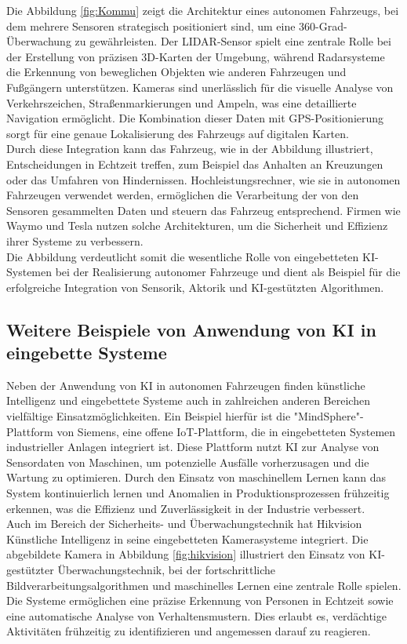 Die Abbildung \ref{fig:Kommu} zeigt die Architektur eines autonomen Fahrzeugs, bei dem mehrere Sensoren strategisch positioniert sind, um eine 360-Grad-Überwachung zu gewährleisten. Der LIDAR-Sensor spielt eine zentrale Rolle bei der Erstellung von präzisen 3D-Karten der Umgebung, während Radarsysteme die Erkennung von beweglichen Objekten wie anderen Fahrzeugen und Fußgängern unterstützen. Kameras sind unerlässlich für die visuelle Analyse von Verkehrszeichen, Straßenmarkierungen und Ampeln, was eine detaillierte Navigation ermöglicht. Die Kombination dieser Daten mit GPS-Positionierung sorgt für eine genaue Lokalisierung des Fahrzeugs auf digitalen Karten.\\
Durch diese Integration kann das Fahrzeug, wie in der Abbildung illustriert, Entscheidungen in Echtzeit treffen, zum Beispiel das Anhalten an Kreuzungen oder das Umfahren von Hindernissen. Hochleistungsrechner, wie sie in autonomen Fahrzeugen verwendet werden, ermöglichen die Verarbeitung der von den Sensoren gesammelten Daten und steuern das Fahrzeug entsprechend. Firmen wie Waymo und Tesla nutzen solche Architekturen, um die Sicherheit und Effizienz ihrer Systeme zu verbessern.\\
Die Abbildung verdeutlicht somit die wesentliche Rolle von eingebetteten KI-Systemen bei der Realisierung autonomer Fahrzeuge und dient als Beispiel für die erfolgreiche Integration von Sensorik, Aktorik und KI-gestützten Algorithmen.\\

\subsection{Weitere Beispiele von Anwendung von KI in eingebette Systeme}
Neben der Anwendung von KI in autonomen Fahrzeugen finden künstliche Intelligenz und eingebettete Systeme auch in zahlreichen anderen Bereichen vielfältige Einsatzmöglichkeiten. Ein Beispiel hierfür ist die "MindSphere"-Plattform von Siemens, eine offene IoT-Plattform, die in eingebetteten Systemen industrieller Anlagen integriert ist. Diese Plattform nutzt KI zur Analyse von Sensordaten von Maschinen, um potenzielle Ausfälle vorherzusagen und die Wartung zu optimieren. Durch den Einsatz von maschinellem Lernen kann das System kontinuierlich lernen und Anomalien in Produktionsprozessen frühzeitig erkennen, was die Effizienz und Zuverlässigkeit in der Industrie verbessert.\\
Auch im Bereich der Sicherheits- und Überwachungstechnik hat Hikvision Künstliche Intelligenz in seine eingebetteten Kamerasysteme integriert. Die abgebildete Kamera in Abbildung \ref{fig:hikvision} illustriert den Einsatz von KI-gestützter Überwachungstechnik, bei der fortschrittliche Bildverarbeitungsalgorithmen und maschinelles Lernen eine zentrale Rolle spielen. Die Systeme ermöglichen eine präzise Erkennung von Personen in Echtzeit sowie eine automatische Analyse von Verhaltensmustern. Dies erlaubt es, verdächtige Aktivitäten frühzeitig zu identifizieren und angemessen darauf zu reagieren.\\  

